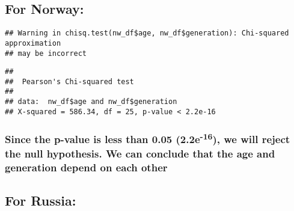 \documentclass[
]{article}
\newenvironment{Shaded}{\begin{snugshade}}{\end{snugshade}}
\newcommand{\FunctionTok}[1]{\textcolor[rgb]{0.00,0.00,0.00}{#1}}
\newcommand{\NormalTok}[1]{#1}
\newcommand{\SpecialCharTok}[1]{\textcolor[rgb]{0.00,0.00,0.00}{#1}}
\begin{document}
\hypertarget{for-norway-1}{%
\subsection{For Norway:}\label{for-norway-1}}

\begin{Shaded}
\end{Shaded}

\begin{verbatim}
## Warning in chisq.test(nw_df$age, nw_df$generation): Chi-squared approximation
## may be incorrect
\end{verbatim}

\begin{verbatim}
## 
##  Pearson's Chi-squared test
## 
## data:  nw_df$age and nw_df$generation
## X-squared = 586.34, df = 25, p-value < 2.2e-16
\end{verbatim}

\hypertarget{since-the-p-value-is-less-than-0.05-2.2e-16-we-will-reject-the-null-hypothesis.-we-can-conclude-that-the-age-and-generation-depend-on-each-other-4}{%
\subsubsection{\texorpdfstring{Since the p-value is less than 0.05
(2.2e\textsuperscript{-16}), we will reject the null hypothesis. We can
conclude that the age and generation depend on each
other}{Since the p-value is less than 0.05 (2.2e-16), we will reject the null hypothesis. We can conclude that the age and generation depend on each other}}\label{since-the-p-value-is-less-than-0.05-2.2e-16-we-will-reject-the-null-hypothesis.-we-can-conclude-that-the-age-and-generation-depend-on-each-other-4}}

\hypertarget{for-russia}{%
\subsection{For Russia:}\label{for-russia}}

\begin{Shaded}
\end{Shaded}
\end{document}

